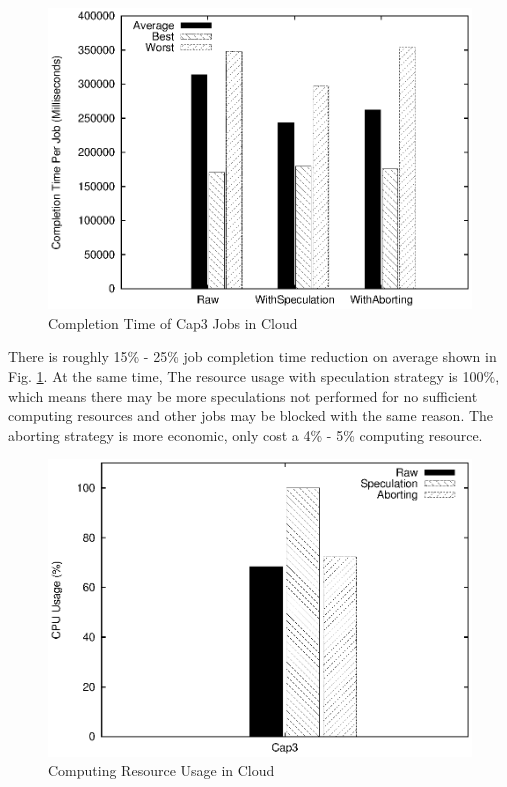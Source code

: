 \begin{figure}
\centering
\includegraphics[width=0.9\columnwidth]{figures/cloud_completiontime_cap3.eps}
\caption{Completion Time of Cap3 Jobs in Cloud}
\label{figure:completiontime_cap3_cloud}
\end{figure}

There is roughly 15\% - 25\% job completion time reduction on average shown in Fig. \ref{figure:completiontime_cap3_cloud}. At the same time, The resource usage with speculation strategy is 100\%, which means there may be more speculations not performed for no sufficient computing resources and other jobs may be blocked with the same reason. The aborting strategy is more economic, only cost a 4\% - 5\% computing resource.

\begin{figure}
\centering
\includegraphics[width=0.9\columnwidth]{figures/cloud_resource_usage.eps}
\caption{Computing Resource Usage in Cloud}
\label{figure:resourceusage_cloud}
\end{figure}

